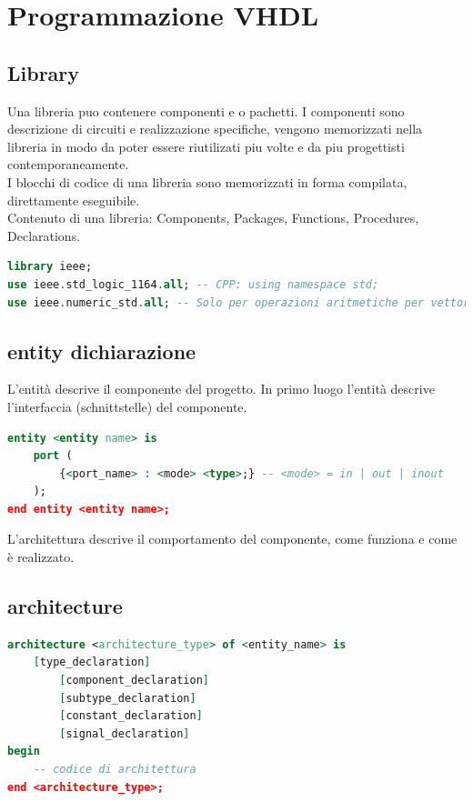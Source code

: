 \section{Programmazione VHDL}
    \subsection{Library}
        Una libreria puo contenere componenti e o pachetti. I componenti sono descrizione di circuiti e realizzazione specifiche,
        vengono memorizzati nella libreria in modo da poter essere riutilizati piu volte e da piu progettisti contemporaneamente.\\
        I blocchi di codice di una libreria sono memorizzati in forma compilata, direttamente eseguibile.\\
        Contenuto di una libreria: Components, Packages, Functions, Procedures, Declarations.
        \begin{lstlisting}[language=VHDL]
library ieee; 
use ieee.std_logic_1164.all; -- CPP: using namespace std;
use ieee.numeric_std.all; -- Solo per operazioni aritmetiche per vettori
        \end{lstlisting}


    \subsection{entity dichiarazione}
        L'entità descrive il componente del progetto.
        In primo luogo l'entità descrive l'interfaccia (schnittstelle) del componente.
        \begin{lstlisting}[language=VHDL]
entity <entity name> is
    port (
        {<port_name> : <mode> <type>;} -- <mode> = in | out | inout
    );
end entity <entity name>;
        \end{lstlisting}

    L'architettura descrive il comportamento del componente, come funziona e come è realizzato.
    \subsection{architecture}
        \begin{lstlisting}[language=VHDL, numberstyle=\tiny\color{gray}\highlightlines{1,7,8,9}{green}]
architecture <architecture_type> of <entity_name> is
    [type_declaration]
        [component_declaration]
        [subtype_declaration]
        [constant_declaration]
        [signal_declaration]
begin
    -- codice di architettura
end <architecture_type>;
        \end{lstlisting}


